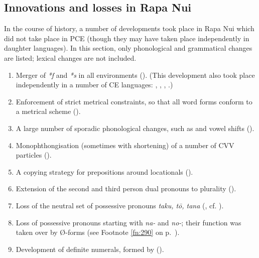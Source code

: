 \subsection{Innovations and losses in Rapa Nui}\label{sec:1.3.2}

In the course of history, a number of developments took place in Rapa Nui which did not take place in PCE (though they may have taken place independently in daughter languages). In this section, only phonological and grammatical changes are listed; lexical changes are not included.

\begin{enumerate}
\item 
Merger of \textit{*f} and \textit{*s} in all environments (). (This development also took place independently in a number of CE languages: , , , .)

\item 
Enforcement of strict metrical constraints, so that all word forms conform to a metrical scheme ().

\item 
A large number of sporadic phonological changes, such as  and vowel shifts ().

\item 
Monophthongisation (sometimes with shortening) of a number of CVV particles ().

\item 
A copying strategy for prepositions around locationals ().

\item 
Extension of the second and third person dual pronouns to plurality ().

\item 
Loss of the neutral set of possessive pronouns \textit{taku, tō, tana} (\citealt{Wilson2012}, cf. ).

\item 
Loss of possessive pronouns starting with \textit{na-} and \textit{no-}; their function was taken over by Ø-forms (see Footnote \ref{fn:290} on p.~\pageref{fn:290}).

\item 
Development of definite numerals, formed by  ().


\end{enumerate}
